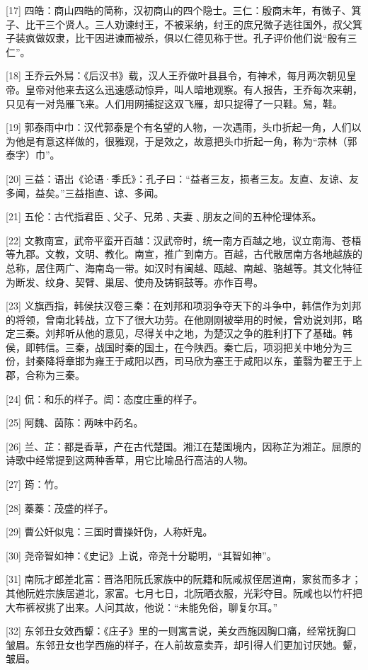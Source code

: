 \documentclass[12pt,UTF8]{ctexbook}
\begin{document}
[17] 四皓：商山四皓的简称，汉初商山的四个隐士。三仁：殷商末年，有微子、箕子、比干三个贤人。三人劝谏纣王，不被采纳，纣王的庶兄微子逃往国外，叔父箕子装疯做奴隶，比干因进谏而被杀，俱以仁德见称于世。孔子评价他们说“殷有三仁”。

[18] 王乔云外舃：《后汉书》载，汉人王乔做叶县县令，有神术，每月两次朝见皇帝。皇帝对他来去这么迅速感动惊异，叫人暗地观察。有人报告，王乔每次来朝，只见有一对凫雁飞来。人们用网捕捉这双飞雁，却只捉得了一只鞋。舃，鞋。

[19] 郭泰雨中巾：汉代郭泰是个有名望的人物，一次遇雨，头巾折起一角，人们以为他是有意这样做的，很雅观，于是效之，故意把头巾折起一角，称为“宗林（郭泰字）巾”。

[20] 三益：语出《论语·季氏》：孔子曰：“益者三友，损者三友。友直、友谅、友多闻，益矣。”三益指直、谅、多闻。

[21] 五伦：古代指君臣﹑父子、兄弟﹑夫妻﹑朋友之间的五种伦理体系。

[22] 文教南宣，武帝平蛮开百越：汉武帝时，统一南方百越之地，议立南海、苍梧等九郡。文教，文明、教化。南宣，推广到南方。百越，古代散居南方各地越族的总称，居住两广、海南岛一带。如汉时有闽越、瓯越、南越、骆越等。其文化特征为断发、纹身、契臂、巢居、使舟及铸铜鼓等。亦作百粤。

[23] 义旗西指，韩侯扶汉卷三秦：在刘邦和项羽争夺天下的斗争中，韩信作为刘邦的将领，曾南北转战，立下了很大功劳。在他刚刚被举用的时候，曾劝说刘邦，略定三秦。刘邦听从他的意见，尽得关中之地，为楚汉之争的胜利打下了基础。韩侯，即韩信。三秦，战国时秦的国土，在今陕西。秦亡后，项羽把关中地分为三份，封秦降将章邯为雍王于咸阳以西，司马欣为塞王于咸阳以东，董翳为翟王于上郡，合称为三秦。

[24] 侃：和乐的样子。訚：态度庄重的样子。

[25] 阿魏、茵陈：两味中药名。

[26] 兰、芷：都是香草，产在古代楚国。湘江在楚国境内，因称芷为湘芷。屈原的诗歌中经常提到这两种香草，用它比喻品行高洁的人物。

[27] 筠：竹。

[28] 蓁蓁：茂盛的样子。

[29] 曹公奸似鬼：三国时曹操奸伪，人称奸鬼。

[30] 尧帝智如神：《史记》上说，帝尧十分聪明，“其智如神”。

[31] 南阮才郎差北富：晋洛阳阮氏家族中的阮籍和阮咸叔侄居道南，家贫而多才；其他阮姓宗族居道北，家富。七月七日，北阮晒衣服，光彩夺目。阮咸也以竹杆把大布裤衩挑了出来。人问其故，他说：“未能免俗，聊复尔耳。”

[32] 东邻丑女效西颦：《庄子》里的一则寓言说，美女西施因胸口痛，经常抚胸口皱眉。东邻丑女也学西施的样子，在人前故意卖弄，却引得人们更加讨厌她。颦，皱眉。
\end{document}
